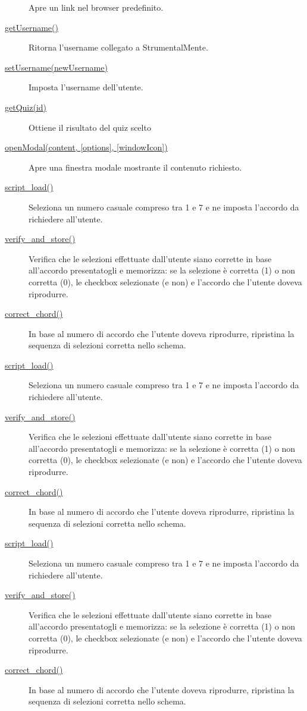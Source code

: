 \begin{description}
Apre un link nel browser predefinito.
\item[{ \protect\hyperlink{getUsername}{getUsername()} }]
Ritorna l'username collegato a StrumentalMente.
\item[{ \protect\hyperlink{setUsername}{setUsername(newUsername)} }]
Imposta l'username dell'utente.
\item[{ \protect\hyperlink{getQuiz}{getQuiz(id)} }]
Ottiene il risultato del quiz scelto
\item[{ \protect\hyperlink{openModal}{openModal(content, {[}options{]},
{[}windowIcon{]})} }]
Apre una finestra modale mostrante il contenuto richiesto.
\item[{ \protect\hyperlink{script_load}{script\_load()} }]
Seleziona un numero casuale compreso tra 1 e 7 e ne imposta l'accordo da
richiedere all'utente.
\item[{ \protect\hyperlink{verify_and_store}{verify\_and\_store()} }]
Verifica che le selezioni effettuate dall'utente siano corrette in base
all'accordo presentatogli e memorizza: se la selezione è corretta (1) o
non corretta (0), le checkbox selezionate (e non) e l'accordo che
l'utente doveva riprodurre.
\item[{ \protect\hyperlink{correct_chord}{correct\_chord()} }]
In base al numero di accordo che l'utente doveva riprodurre, ripristina
la sequenza di selezioni corretta nello schema.
\item[{ \protect\hyperlink{script_load}{script\_load()} }]
Seleziona un numero casuale compreso tra 1 e 7 e ne imposta l'accordo da
richiedere all'utente.
\item[{ \protect\hyperlink{verify_and_store}{verify\_and\_store()} }]
Verifica che le selezioni effettuate dall'utente siano corrette in base
all'accordo presentatogli e memorizza: se la selezione è corretta (1) o
non corretta (0), le checkbox selezionate (e non) e l'accordo che
l'utente doveva riprodurre.
\item[{ \protect\hyperlink{correct_chord}{correct\_chord()} }]
In base al numero di accordo che l'utente doveva riprodurre, ripristina
la sequenza di selezioni corretta nello schema.
\item[{ \protect\hyperlink{script_load}{script\_load()} }]
Seleziona un numero casuale compreso tra 1 e 7 e ne imposta l'accordo da
richiedere all'utente.
\item[{ \protect\hyperlink{verify_and_store}{verify\_and\_store()} }]
Verifica che le selezioni effettuate dall'utente siano corrette in base
all'accordo presentatogli e memorizza: se la selezione è corretta (1) o
non corretta (0), le checkbox selezionate (e non) e l'accordo che
l'utente doveva riprodurre.
\item[{ \protect\hyperlink{correct_chord}{correct\_chord()} }]
In base al numero di accordo che l'utente doveva riprodurre, ripristina
la sequenza di selezioni corretta nello schema.
\end{description}

